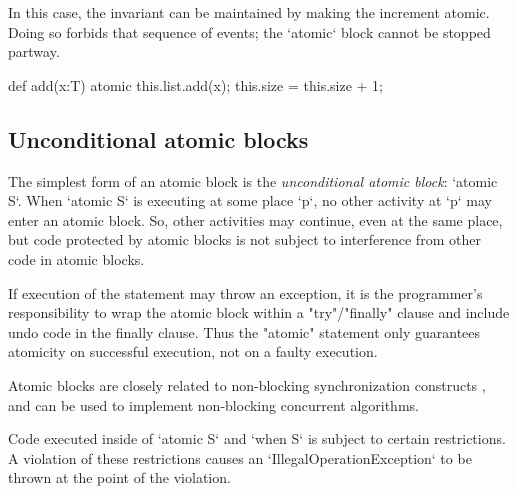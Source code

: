In this case, the invariant can be maintained by making the increment atomic.
Doing so forbids that sequence of events; the \xcd`atomic` block cannot be
stopped partway.  
\begin{xten}
def add(x:T) { 
  atomic {
    this.list.add(x);
    this.size = this.size + 1; 
  }
}
\end{xten}

\subsection{Unconditional atomic blocks}
The simplest form of an atomic block is the {\em unconditional
atomic block}: \xcd`atomic S`.
When \xcd`atomic S` is executing at some place \xcd`p`, no other activity at
\xcd`p` may enter an atomic block.  
So, other activities may continue, even at the same place, but code protected
by atomic blocks is not subject to interference from other code in atomic
blocks. 

If execution of the statement may throw an exception, it is
the programmer's responsibility to wrap the atomic block within a
\xcd"try"/\xcd"finally" clause and include undo code in the finally
clause. Thus the \xcd"atomic" statement only guarantees atomicity on
successful execution, not on a faulty execution.




Atomic blocks are closely related to non-blocking synchronization
constructs \cite{herlihy91waitfree}, and can be used to implement 
non-blocking concurrent algorithms.

Code executed inside of \xcd`atomic S` and \xcd`when S` is subject
to certain restrictions. A violation of these restrictions causes an 
\xcd`IllegalOperationException` to be thrown at the point of the violation.


